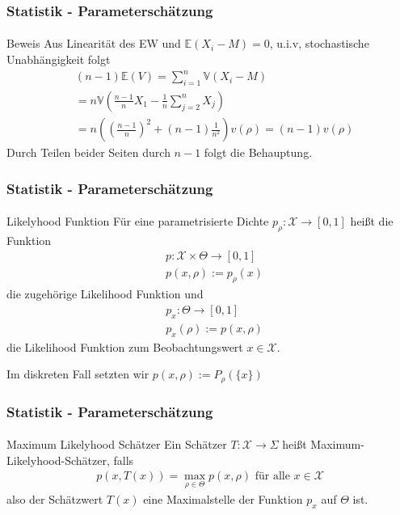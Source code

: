 \documentclass{beamer}
\begin{document}
\begin{frame}
    \frametitle{Statistik - Parameterschätzung}
\framesubtitle{}

\begin{block}{Beweis}
Aus Linearität des EW und $\mathbb{E}(X_i - M) = 0$, u.i.v, stochastische Unabhängigkeit folgt
\begin{align*}
&(n-1) \mathbb{E}(V)  = \sum_{i=1}^n  \mathbb{V}(X_i - M) \\
& = n   \mathbb{V} (\frac{n-1}{n} X_1  - \frac{1}{n} \sum_{j=2}^n X_j) \\
& = n((\frac{n-1}{n})^2 + (n-1) \frac{1}{n^2}  ) v(\rho) = (n-1) v(\rho)
\end{align*}
Durch Teilen beider Seiten durch $n-1$ folgt die Behauptung. 
\end{block}


 \end{frame}




\begin{frame}
    \frametitle{Statistik - Parameterschätzung}
\framesubtitle{}

\begin{block}{Likelyhood Funktion}
Für eine parametrisierte Dichte $p_\rho : \mathcal{X}   \to  [0,1]$ heißt die Funktion
\begin{align*}
& p  : \mathcal{X}  \times  \Theta  \to  [0,1] \\
& p(x, \rho) := p_\rho (x)
\end{align*}
die zugehörige Likelihood Funktion und 
\begin{align*}
& p_x  : \Theta   \to  [0,1] \\
& p_x(\rho):=  p(x, \rho) 
\end{align*}
die Likelihood Funktion zum Beobachtungswert $x \in \mathcal{X}$.

Im diskreten Fall setzten wir $ p(x, \rho) := P_\rho (\{ x\})$
\end{block}
 \end{frame}



\begin{frame}
    \frametitle{Statistik - Parameterschätzung}
\framesubtitle{}
\begin{block}{Maximum Likelyhood Schätzer}
Ein Schätzer $T: \mathcal{X} \to \Sigma$ heißt Maximum-Likelyhood-Schätzer, falls
\begin{align*}
p(x , T(x)) = \max_{\rho \in \Theta} p (x, \rho) \text{ für alle } x \in \mathcal{X}
\end{align*}
also der Schätzwert $T(x)$ eine Maximalstelle der Funktion  $p_x$ auf $\Theta$ ist.
\end{block}

 \end{frame}
\end{document}
